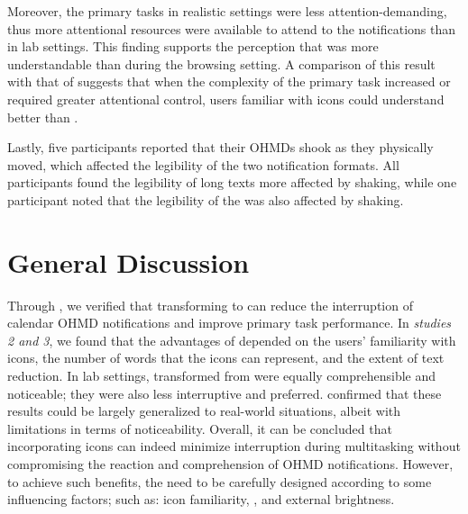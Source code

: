 Moreover, the primary tasks in realistic settings were less attention-demanding, thus more attentional resources were available to attend to the notifications than in lab settings. This finding supports the perception that \textformat{} was more understandable than \iconformat{} during the browsing setting. A comparison of this result with that of \studythree{} suggests that when the complexity of the primary task increased or required greater attentional control, users familiar with icons could understand \iconformat{} better than \textformat{}.

Lastly, five participants reported that their OHMDs shook as they physically moved, which affected the legibility of the two notification formats. All participants found the legibility of long texts more affected by shaking, while one participant noted that the legibility of the \iconformat{} was also affected by shaking.















\section{General Discussion}
\label{sec:IconNotif:general_discussion}

Through \studyone{}, we verified that transforming  to  can reduce the interruption of calendar OHMD notifications and improve primary task performance. In \textit{studies 2 and 3}, we found that the advantages of  depended on the users' familiarity with icons, the number of words that the icons can represent, and the extent of text reduction. In lab settings,  transformed from  were equally comprehensible and noticeable; they were also less interruptive and preferred. \Studyfour{} confirmed that these results could be largely generalized to real-world situations, albeit with limitations in terms of noticeability. Overall, it can be concluded that incorporating icons can indeed minimize interruption during multitasking without compromising the reaction and comprehension of OHMD notifications. However, to achieve such benefits, the  need to be carefully designed according to some influencing factors; such as: icon familiarity, \encodingcomplexity{}, and external brightness.


